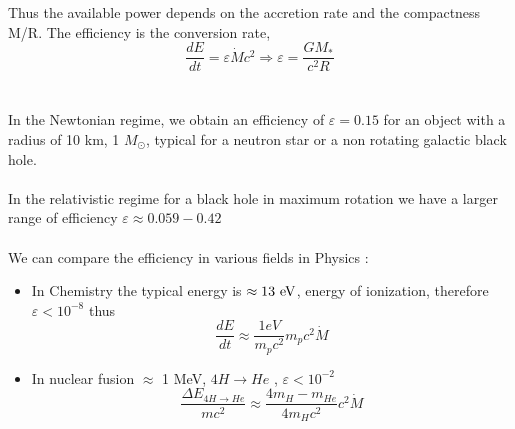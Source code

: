 \documentclass[10pt,a4paper,english]{article}
\begin{document}
Thus the available power depends on the accretion rate and the compactness M/R. The efficiency is the conversion rate,
\begin{equation}
 \frac{dE}{dt} = \varepsilon \dot{M} c^{2} \Rightarrow \varepsilon = \frac{GM_*}{c^{2}R} 
\end{equation}
\\
\\
In the Newtonian regime, we obtain an efficiency of $\varepsilon = 0.15$ for an object with a radius of 10 km, 1 $M_{\odot}$, typical for a neutron star or a non rotating galactic black hole.
\\
\\
In the relativistic regime for a black hole in maximum rotation we have a larger range of efficiency $\varepsilon \approx 0.059-0.42$
\\
\\
We can compare the efficiency in various fields in Physics :
\begin{itemize}
  \item In Chemistry the typical energy is $\approx 13\ \mathrm{eV}$, energy of ionization, therefore $\varepsilon < 10^{-8}$ thus
  \begin{equation}
  \frac{dE}{dt} \approx \frac{1 eV}{m_{p}c^{2}} m_{p}c^{2}\dot{M}
  \end{equation}
  \item In nuclear fusion $\approx$ 1 MeV, $4H \rightarrow He$ , $\varepsilon < 10^{-2}$
  \begin{equation}
  \frac {\Delta E_{4H \rightarrow He}}{mc^{2}} \approx \dfrac{4m_{H}-m_{He}}{4m_{H}c^{2}} c^{2}\dot{M}
  \end{equation}
\end{itemize}
\end{document}
